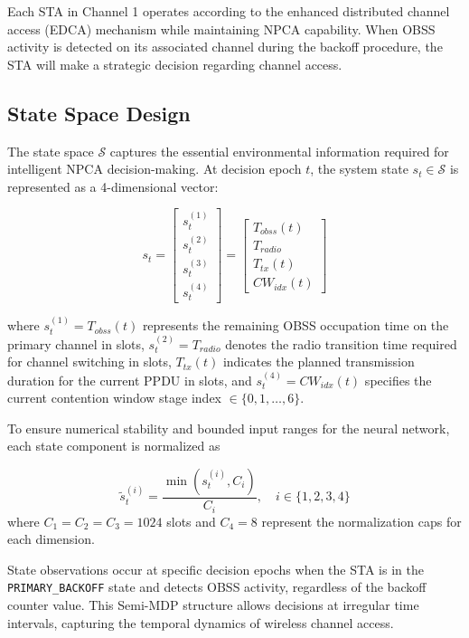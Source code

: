 \documentclass[conference]{IEEEtran}
\begin{document}
Each STA in Channel 1 operates according to the enhanced distributed channel access (EDCA) mechanism while maintaining NPCA capability. When OBSS activity is detected on its associated channel during the backoff procedure, the STA will make a strategic decision regarding channel access.

\subsection{State Space Design}

The state space $\mathcal{S}$ captures the essential environmental information required for intelligent NPCA decision-making. At decision epoch $t$, the system state $s_t \in \mathcal{S}$ is represented as a 4-dimensional vector:

\begin{equation}
s_t = \begin{bmatrix} s_t^{(1)} \\ s_t^{(2)} \\ s_t^{(3)} \\ s_t^{(4)} \end{bmatrix} = \begin{bmatrix} T_{obss}(t) \\ T_{radio} \\ T_{tx}(t) \\ CW_{idx}(t) \end{bmatrix}
\label{eq:state_vector}
\end{equation}

where $s_t^{(1)} = T_{obss}(t)$ represents the remaining OBSS occupation time on the primary channel in slots, $s_t^{(2)} = T_{radio}$ denotes the radio transition time required for channel switching in slots, $T_{tx}(t)$ indicates the planned transmission duration for the current PPDU in slots, and $s_t^{(4)} = CW_{idx}(t)$ specifies the current contention window stage index $\in \{0, 1, \ldots, 6\}$.

To ensure numerical stability and bounded input ranges for the neural network, each state component is normalized as

\begin{equation}
\tilde{s}_t^{(i)} = \frac{\min(s_t^{(i)}, C_i)}{C_i}, \quad i \in \{1,2,3,4\}
\label{eq:state_normalization}
\end{equation}
where $C_1 = C_2 = C_3 = 1024$ slots and $C_4 = 8$ represent the normalization caps for each dimension.

State observations occur at specific decision epochs when the STA is in the \texttt{PRIMARY\_BACKOFF} state and detects OBSS activity, regardless of the backoff counter value. This Semi-MDP structure allows decisions at irregular time intervals, capturing the temporal dynamics of wireless channel access.
\end{document}
